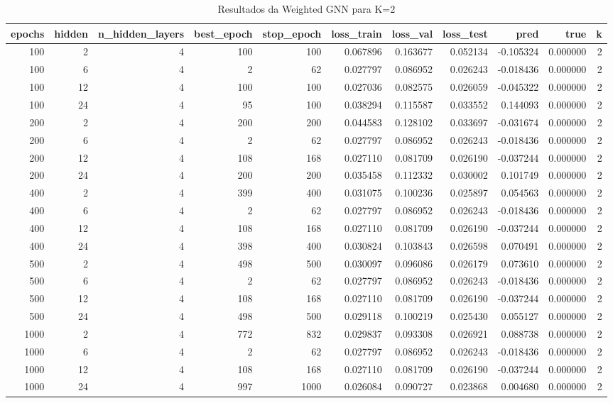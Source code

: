 \begin{table}
\caption{Resultados da Weighted GNN para K=2}
\label{tab:weighted_gnn_results_k2}
\begin{tabular}{rrrrrrrrrrr}
\toprule
epochs & hidden & n\_hidden\_layers & best\_epoch & stop\_epoch & loss\_train & loss\_val & loss\_test & pred & true & k \\
\midrule
100 & 2 & 4 & 100 & 100 & 0.067896 & 0.163677 & 0.052134 & -0.105324 & 0.000000 & 2 \\
100 & 6 & 4 & 2 & 62 & 0.027797 & 0.086952 & 0.026243 & -0.018436 & 0.000000 & 2 \\
100 & 12 & 4 & 100 & 100 & 0.027036 & 0.082575 & 0.026059 & -0.045322 & 0.000000 & 2 \\
100 & 24 & 4 & 95 & 100 & 0.038294 & 0.115587 & 0.033552 & 0.144093 & 0.000000 & 2 \\
200 & 2 & 4 & 200 & 200 & 0.044583 & 0.128102 & 0.033697 & -0.031674 & 0.000000 & 2 \\
200 & 6 & 4 & 2 & 62 & 0.027797 & 0.086952 & 0.026243 & -0.018436 & 0.000000 & 2 \\
200 & 12 & 4 & 108 & 168 & 0.027110 & 0.081709 & 0.026190 & -0.037244 & 0.000000 & 2 \\
200 & 24 & 4 & 200 & 200 & 0.035458 & 0.112332 & 0.030002 & 0.101749 & 0.000000 & 2 \\
400 & 2 & 4 & 399 & 400 & 0.031075 & 0.100236 & 0.025897 & 0.054563 & 0.000000 & 2 \\
400 & 6 & 4 & 2 & 62 & 0.027797 & 0.086952 & 0.026243 & -0.018436 & 0.000000 & 2 \\
400 & 12 & 4 & 108 & 168 & 0.027110 & 0.081709 & 0.026190 & -0.037244 & 0.000000 & 2 \\
400 & 24 & 4 & 398 & 400 & 0.030824 & 0.103843 & 0.026598 & 0.070491 & 0.000000 & 2 \\
500 & 2 & 4 & 498 & 500 & 0.030097 & 0.096086 & 0.026179 & 0.073610 & 0.000000 & 2 \\
500 & 6 & 4 & 2 & 62 & 0.027797 & 0.086952 & 0.026243 & -0.018436 & 0.000000 & 2 \\
500 & 12 & 4 & 108 & 168 & 0.027110 & 0.081709 & 0.026190 & -0.037244 & 0.000000 & 2 \\
500 & 24 & 4 & 498 & 500 & 0.029118 & 0.100219 & 0.025430 & 0.055127 & 0.000000 & 2 \\
1000 & 2 & 4 & 772 & 832 & 0.029837 & 0.093308 & 0.026921 & 0.088738 & 0.000000 & 2 \\
1000 & 6 & 4 & 2 & 62 & 0.027797 & 0.086952 & 0.026243 & -0.018436 & 0.000000 & 2 \\
1000 & 12 & 4 & 108 & 168 & 0.027110 & 0.081709 & 0.026190 & -0.037244 & 0.000000 & 2 \\
1000 & 24 & 4 & 997 & 1000 & 0.026084 & 0.090727 & 0.023868 & 0.004680 & 0.000000 & 2 \\
\bottomrule
\end{tabular}
\end{table}
